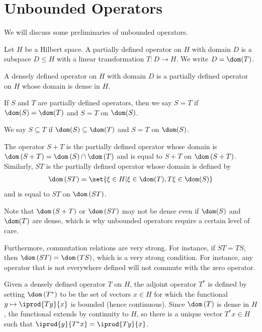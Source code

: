 \documentclass[10pt]{mypackage}
\begin{document}
\RaggedRight
\section{Unbounded Operators}%
We will discuss some preliminaries of unbounded operators.
\begin{definition}
  Let $H$ be a Hilbert space. A partially defined operator on $H$ with domain $D$ is a subspace $D\leq H$ with a linear transformation $T\colon D\rightarrow H$. We write $D = \dom(T)$.

  A densely defined operator on $H$ with domain $D$ is a partially defined operator on $H$ whose domain is dense in $H$.
\end{definition}
\begin{definition}
  If $S$ and $T$ are partially defined operators, then we say $S = T$ if $\dom(S) = \dom(T)$ and $S = T$ on $\dom(S)$.

  We say $S\subseteq T$ if $\dom(S)\subseteq \dom(T)$ and $S = T$ on $\dom(S)$.

  The operator $S + T$ is the partially defined operator whose domain is $\dom\left( S+T \right) = \dom\left( S \right) \cap \dom\left( T \right)$ and is equal to $S + T$ on $\dom\left( S+T \right)$. Similarly, $ST$ is the partially defined operator whose domain is defined by
  \begin{align*}
    \dom\left( ST \right) = \set{\xi\in H | \xi\in \dom(T),T\xi\in\dom(S)}
  \end{align*}
  and is equal to $ST$ on $\dom\left( ST \right)$. 
\end{definition}
\begin{remark}
  Note that $\dom\left( S+T \right)$ or $\dom\left( ST \right)$ may not be dense even if $\dom(S)$ and $\dom(T)$ are dense, which is why unbounded operators require a certain level of care.

  Furthermore, commutation relations are very strong. For instance, if $ST = TS$, then $\dom\left( ST \right) = \dom\left( TS \right)$, which is a very strong condition. For instance, any operator that is not everywhere defined will not commute with the zero operator.
\end{remark}
\begin{definition}
  Given a densely defined operator $T$ on $H$, the adjoint operator $T^{\ast}$ is defined by setting $\dom\left( T^{\ast} \right)$ to be the set of vectors $x\in H$ for which the functional $y\mapsto \iprod{Ty}{x}$ is bounded (hence continuous). Since $\dom\left( T \right)$ is dense in $H$, the functional extends by continuity to $H$, so there is a unique vector $T^{\ast}x\in H$ such that $ \iprod{y}{T^{\ast}x} = \iprod{Ty}{x} $.
\end{definition}
\end{document}

